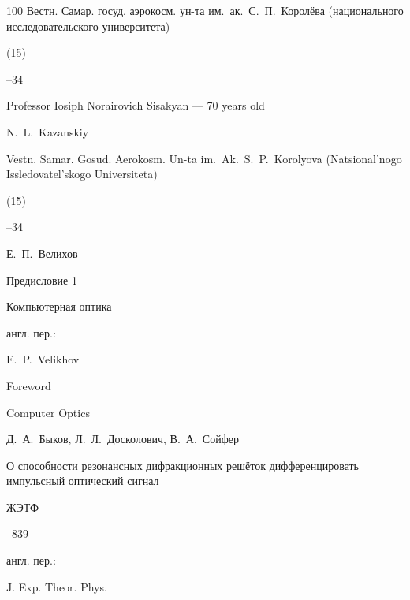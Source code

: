 \begin{thebibliography}{100}
\jour Вестн. Самар. госуд. аэрокосм. ун-та им.~ак.~С.~П.~Королёва (национального исследовательского университета)


(15)

--34

\misctransl

\paper Professor Iosiph Norairovich Sisakyan --- 70 years old

\by N.~L.~Kazanskiy

\jour Vestn. Samar. Gosud. Aerokosm. Un-ta im.~Ak.~S.~P.~Korolyova (Natsional'nogo Issledovatel'skogo Universiteta)


(15)

--34






\by Е.~П.~Велихов

\paper Предисловие 1

\jour Компьютерная оптика




\transl англ. пер.:~

\by E.~P.~Velikhov

\paper Foreword

\jour Computer Optics








\by Д.~А.~Быков, Л.~Л.~Досколович, В.~А.~Сойфер

\paper О способности резонансных дифракционных решёток дифференцировать импульсный оптический сигнал

\jour ЖЭТФ




--839

\transl англ. пер.:~

\jour J. Exp. Theor. Phys.





\end{thebibliography}
